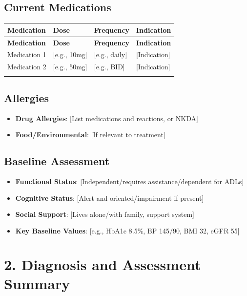 \documentclass[11pt,letterpaper]{article}
\begin{document}
\subsection*{Current Medications}
\begin{longtable}{|p{3.5cm}|p{2cm}|p{2cm}|p{5cm}|}
\hline
\textbf{Medication} & \textbf{Dose} & \textbf{Frequency} & \textbf{Indication} \\ \hline
\endfirsthead
\hline
\textbf{Medication} & \textbf{Dose} & \textbf{Frequency} & \textbf{Indication} \\ \hline
\endhead
Medication 1 & [e.g., 10mg] & [e.g., daily] & [Indication] \\ \hline
Medication 2 & [e.g., 50mg] & [e.g., BID] & [Indication] \\ \hline
[Add rows as needed] & & & \\ \hline
\end{longtable}

\subsection*{Allergies}
\begin{itemize}[leftmargin=*]
    \item \textbf{Drug Allergies}: [List medications and reactions, or NKDA]
    \item \textbf{Food/Environmental}: [If relevant to treatment]
\end{itemize}

\subsection*{Baseline Assessment}
\begin{itemize}[leftmargin=*]
    \item \textbf{Functional Status}: [Independent/requires assistance/dependent for ADLs]
    \item \textbf{Cognitive Status}: [Alert and oriented/impairment if present]
    \item \textbf{Social Support}: [Lives alone/with family, support system]
    \item \textbf{Key Baseline Values}: [e.g., HbA1c 8.5\%, BP 145/90, BMI 32, eGFR 55]
\end{itemize}

\section*{2. Diagnosis and Assessment Summary}
\end{document}
